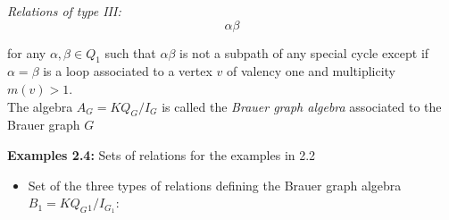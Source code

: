 \documentclass{amsart}
\numberwithin{figure}{section}
\begin{document}
\textit{Relations of type III: }
\[
\alpha\beta
\]

for any $\alpha,\beta \in Q_1$ such that $\alpha\beta$ is not a subpath of any special cycle except if $\alpha=\beta$ is a loop associated to a vertex $v$ of valency one and multiplicity $m(v)>1$.\\

The algebra $A_G=KQ_G/I_G$ is called the \textit{Brauer graph algebra} associated to the Brauer graph $G$

\textbf{Examples 2.4: } Sets of relations for the examples in 2.2
\begin{itemize}
    \item Set of the three types of relations defining the Brauer graph algebra $B_1=KQ_G{_1}/I_{G_1}$:
    
\end{itemize}
\end{document}
